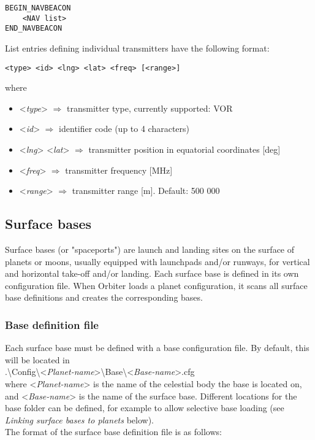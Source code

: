 \documentclass[Orbiter Developer Manual.tex]{subfiles}
\begin{document}
\begin{lstlisting}[language=OSFS]
BEGIN_NAVBEACON
	<NAV list>
END_NAVBEACON
\end{lstlisting}

\noindent
List entries defining individual transmitters have the following format:

\begin{lstlisting}[language=OSFS]
<type> <id> <lng> <lat> <freq> [<range>]
\end{lstlisting}

\noindent
where

\begin{itemize}
\item <\textit{type}> $\Rightarrow$ transmitter type, currently supported: VOR
\item <\textit{id}> $\Rightarrow$ identifier code (up to 4 characters)
\item <\textit{lng}> <\textit{lat}> $\Rightarrow$ transmitter position in equatorial coordinates [deg]
\item <\textit{freq}> $\Rightarrow$ transmitter frequency [MHz]
\item <\textit{range}> $\Rightarrow$ transmitter range [m]. Default: 500 000
\end{itemize}


\subsection{Surface bases}
\label{ssec:surface_bases}
Surface bases (or "spaceports") are launch and landing sites on the surface of planets or moons, usually equipped with launchpads and/or runways, for vertical and horizontal take-off and/or landing. Each surface base is defined in its own configuration file. When Orbiter loads a planet configuration, it scans all surface base definitions and creates the corresponding bases.

\subsubsection*{Base definition file}
Each surface base must be defined with a base configuration file. By default, this will be located in\\
\indent .\textbackslash Config\textbackslash <\textit{Planet-name}>\textbackslash Base\textbackslash <\textit{Base-name}>.cfg\\
where <\textit{Planet-name}> is the name of the celestial body the base is located on, and <\textit{Base-name}> is the name of the surface base. Different locations for the base folder can be defined, for example to allow selective base loading (see \textit{Linking surface bases to planets} below).\\
The format of the surface base definition file is as follows:
\end{document}
